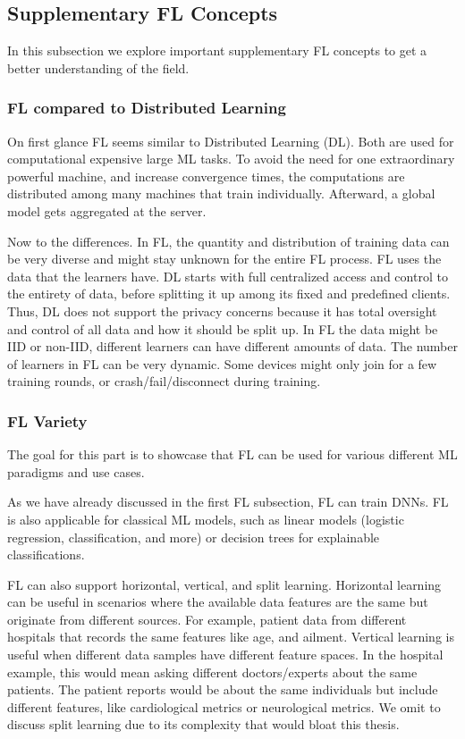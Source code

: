 \subsection{Supplementary FL Concepts}

In this subsection we explore important supplementary FL concepts
to get a better understanding of the field.

\subsubsection{FL compared to Distributed Learning}

On first glance FL seems similar to Distributed Learning (DL).
Both are used for computational expensive large ML tasks.
To avoid the need for one extraordinary powerful machine,
and increase convergence times, 
the computations are distributed among many machines that
train individually. Afterward, a global model gets aggregated
at the server.

Now to the differences.
In FL, the quantity and distribution of training data
can be very diverse and might stay unknown for the entire FL process.
FL uses the data that the learners have. 
DL starts with full centralized access and control to the entirety of data,
before splitting it up among its fixed and predefined clients.
Thus, DL does not support the privacy concerns because it has
total oversight and control of all data and how it should be split up.
In FL the data might be IID or non-IID, different learners can have
different amounts of data.
The number of learners in FL can be very dynamic.
Some devices might only join for a few training rounds,
or crash/fail/disconnect during training.

\subsubsection{FL Variety}

The goal for this part is to showcase that FL can
be used for various different ML paradigms and use cases.

As we have already discussed in the first FL subsection,
FL can train DNNs.
FL is also applicable for classical ML models, such as
linear models (logistic regression, classification, and more) or
decision trees for explainable classifications.

FL can also support horizontal, vertical, and split learning.
Horizontal learning can be useful in scenarios where the available data features are the same but
originate from different sources.
For example, patient data from different hospitals
that records the same features like age, and ailment.
Vertical learning is useful when different data samples have
different feature spaces.
In the hospital example, this would mean asking different doctors/experts
about the same patients. 
The patient reports would be about the same individuals but include different features,
like cardiological metrics or neurological metrics.
We omit to discuss split learning due to its complexity that would bloat this thesis.

